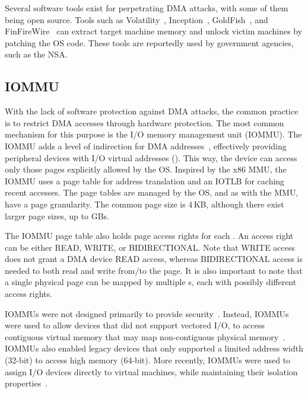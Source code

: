 Several software tools exist for perpetrating DMA attacks, with some of them being open source. Tools such as Volatility~\cite{Vol}, Inception~\cite{MM}, GoldFish~\cite{GA10}, and FinFireWire~\cite{Fin14} can extract target machine memory and unlock victim machines by patching the OS code. These tools are reportedly used by government agencies, such as the NSA.

\subsection{IOMMU}

With the lack of software protection against DMA attacks, the common practice is to restrict DMA accesses through hardware protection. The most common mechanism for this purpose is the I/O memory management unit (IOMMU). The IOMMU adds a level of indirection for DMA addresses~\cite{WRC08,YZ15,SB12,MTF12}, effectively providing peripheral devices with I/O virtual addresses (\iova{}). This way, the device can access only those pages explicitly allowed by the OS. Inspired by the x86 MMU, the IOMMU uses a page table for address translation and an IOTLB for caching recent accesses.  The page tables are managed by the OS, and as with the MMU, have a page granularity. The common page size is 4\,KB, although there exist larger page sizes, up to GBs.

The IOMMU page table also holds page access rights for each \iova. An access right can be either READ, WRITE, or BIDIRECTIONAL. Note that WRITE access does not grant a DMA device READ access, whereas BIDIRECTIONAL access is needed to both read and write from/to the page. It is also important to note that a single physical page can be mapped by multiple \iova{}s, each with possibly different access rights.

IOMMUs were not designed primarily to provide security~\cite{DWT79}. Instead, IOMMUs were used to allow devices that did not support vectored I/O, to access contiguous virtual memory that may map non-contiguous physical memory~\cite{Chu96, WMM97}. IOMMUs also enabled legacy devices that only supported a limited address width (32-bit) to access high memory (64-bit). More recently, IOMMUs were used to assign I/O devices directly to virtual machines, while maintaining their isolation properties~\cite{Int16b, AMD16}. 
